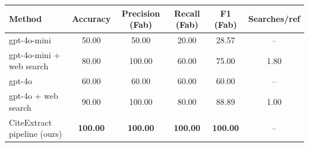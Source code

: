 \begin{tabular}{lccccc}
\toprule
Method & Accuracy & Precision (Fab) & Recall (Fab) & F1 (Fab) & Searches/ref \\
\midrule
gpt-4o-mini & 50.00 & 50.00 & 20.00 & 28.57 & -- \\
gpt-4o-mini + web search & 80.00 & 100.00 & 60.00 & 75.00 & 1.80 \\
gpt-4o & 60.00 & 60.00 & 60.00 & 60.00 & -- \\
gpt-4o + web search & 90.00 & 100.00 & 80.00 & 88.89 & 1.00 \\
CiteExtract pipeline (ours) & \textbf{100.00} & \textbf{100.00} & \textbf{100.00} & \textbf{100.00} & -- \\
\bottomrule
\end{tabular}
